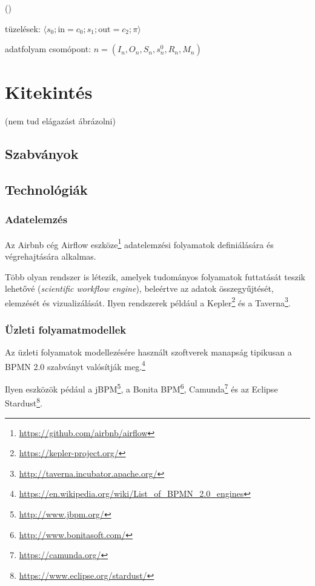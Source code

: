  


 ()

\newcommand{\prioritas}{\pi}
\newcommand{\tuple}[1]{\langle #1 \rangle}

tüzelések: $\tuple{s_0; \mathrm{in} = c_0; s_1; \mathrm{out} = c_2; \prioritas}$

adatfolyam csomópont: $n = (I_n, O_n, S_n, s_n^0, R_n, M_n)$

\section{Kitekintés\kieg}


 (nem tud elágazást ábrázolni)

\subsection{Szabványok}


\subsection{Technológiák}

\subsubsection{Adatelemzés}

Az Airbnb cég Airflow eszköze\footnote{\url{https://github.com/airbnb/airflow}} adatelemzési folyamatok definiálására és végrehajtására alkalmas.

Több olyan rendszer is létezik, amelyek tudományos folyamatok futtatását teszik lehetővé (\emph{scientific workflow engine}), beleértve az adatok összegyűjtését, elemzését és vizualizálását. Ilyen rendszerek például a 
Kepler\footnote{\url{https://kepler-project.org/}} és a Taverna\footnote{\url{http://taverna.incubator.apache.org/}}.

\subsubsection{Üzleti folyamatmodellek}

Az üzleti folyamatok modellezésére használt szoftverek manapság tipikusan a BPMN 2.0 szabványt valósítják meg.\footnote{\url{https://en.wikipedia.org/wiki/List_of_BPMN_2.0_engines}}

Ilyen eszközök pédául a jBPM\footnote{\url{http://www.jbpm.org/}}, a Bonita BPM\footnote{\url{http://www.bonitasoft.com/}}, Camunda\footnote{\url{https://camunda.org/}} és az Eclipse Stardust\footnote{\url{https://www.eclipse.org/stardust/}}.

